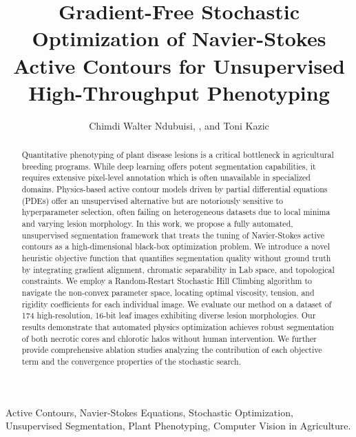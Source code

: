 \documentclass[journal]{IEEEtran}
\begin{document}
\title{Gradient-Free Stochastic Optimization of Navier-Stokes Active Contours for Unsupervised High-Throughput Phenotyping}

\author{Chimdi Walter Ndubuisi, , and Toni Kazic}

\maketitle

\begin{abstract}
Quantitative phenotyping of plant disease lesions is a critical bottleneck in agricultural breeding programs. While deep learning offers potent segmentation capabilities, it requires extensive pixel-level annotation which is often unavailable in specialized domains. Physics-based active contour models driven by partial differential equations (PDEs) offer an unsupervised alternative but are notoriously sensitive to hyperparameter selection, often failing on heterogeneous datasets due to local minima and varying lesion morphology. In this work, we propose a fully automated, unsupervised segmentation framework that treats the tuning of Navier-Stokes active contours as a high-dimensional black-box optimization problem. We introduce a novel heuristic objective function that quantifies segmentation quality without ground truth by integrating gradient alignment, chromatic separability in Lab space, and topological constraints. We employ a Random-Restart Stochastic Hill Climbing algorithm to navigate the non-convex parameter space, locating optimal viscosity, tension, and rigidity coefficients for each individual image. We evaluate our method on a dataset of 174 high-resolution, 16-bit leaf images exhibiting diverse lesion morphologies. Our results demonstrate that automated physics optimization achieves robust segmentation of both necrotic cores and chlorotic halos without human intervention. We further provide comprehensive ablation studies analyzing the contribution of each objective term and the convergence properties of the stochastic search.
\end{abstract}

\begin{IEEEkeywords}
Active Contours, Navier-Stokes Equations, Stochastic Optimization, Unsupervised Segmentation, Plant Phenotyping, Computer Vision in Agriculture.
\end{IEEEkeywords}
\end{document}
